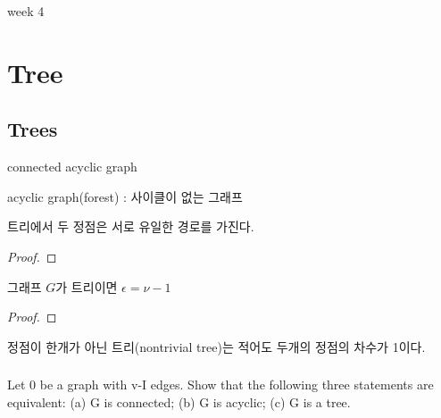 
week 4
\section{Tree}
\subsection{Trees}

\begin{dfn}[tree] connected acyclic graph

    acyclic graph(forest) : 사이클이 없는 그래프

\end{dfn}


\begin{theorem}
    트리에서 두 정점은 서로 유일한 경로를 가진다.    
\end{theorem}

\begin{proof}
    
\end{proof}
\begin{theorem}
    그래프 $G$가 트리이면 $\epsilon = \nu-1$
\end{theorem}

\begin{proof}
    
\end{proof}


\begin{corollary}
    정점이 한개가 아닌 트리(nontrivial tree)는 적어도 두개의 정점의 차수가 1이다.    
\end{corollary}
\subsubsection{} 
%
\subsubsection{} 
%
\subsubsection{} 
%
\subsubsection{} 
%
\subsubsection{} 
Let 0 be a graph with v-I edges. Show that the following three statements are equivalent: 
(a) G is connected;
(b) G is acyclic;
(c) G is a tree.

